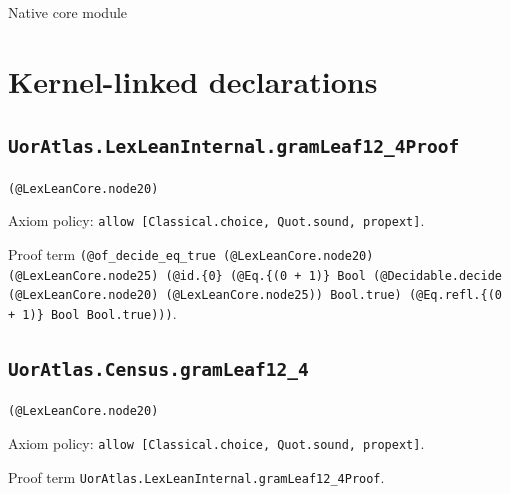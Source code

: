 \documentclass[11pt]{article}
\begin{document}
\begin{center}{\LARGE Native core module}\end{center}
\section*{Kernel-linked declarations}
\subsection*{\texttt{UorAtlas.LexLeanInternal.gramLeaf12\_4Proof}}
\noindent\texttt{(@LexLeanCore.node20)}\par
\noindent Axiom policy: \texttt{allow [Classical.choice, Quot.sound, propext]}.\par
\noindent Proof term \texttt{(@of\_decide\_eq\_true (@LexLeanCore.node20) (@LexLeanCore.node25) (@id.\{0\} (@Eq.\{(0 + 1)\} Bool (@Decidable.decide (@LexLeanCore.node20) (@LexLeanCore.node25)) Bool.true) (@Eq.refl.\{(0 + 1)\} Bool Bool.true)))}.\par
\subsection*{\texttt{UorAtlas.Census.gramLeaf12\_4}}
\noindent\texttt{(@LexLeanCore.node20)}\par
\noindent Axiom policy: \texttt{allow [Classical.choice, Quot.sound, propext]}.\par
\noindent Proof term \texttt{UorAtlas.LexLeanInternal.gramLeaf12\_4Proof}.\par
\end{document}
